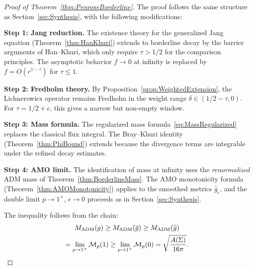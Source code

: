 \begin{proof}[Proof of Theorem~\ref{thm:PenroseBorderline}]
The proof follows the same structure as Section~\ref{sec:Synthesis}, with the following modifications:

\textbf{Step 1: Jang reduction.} The existence theory for the generalized Jang equation (Theorem~\ref{thm:HanKhuri}) extends to borderline decay by the barrier arguments of Han--Khuri, which only require $\tau > 1/2$ for the comparison principles. The asymptotic behavior $f \to 0$ at infinity is replaced by $f = O(r^{1-\tau})$ for $\tau \le 1$.

\textbf{Step 2: Fredholm theory.} By Proposition~\ref{prop:WeightedExtension}, the Lichnerowicz operator remains Fredholm in the weight range $\delta \in (1/2 - \tau, 0)$. For $\tau = 1/2 + \epsilon$, this gives a narrow but non-empty window.

\textbf{Step 3: Mass formula.} The regularized mass formula~\eqref{eq:MassRegularized} replaces the classical flux integral. The Bray--Khuri identity (Theorem~\ref{thm:PhiBound}) extends because the divergence terms are integrable under the refined decay estimates.

\textbf{Step 4: AMO limit.} The identification of mass at infinity uses the \emph{renormalized} ADM mass of Theorem~\ref{thm:BorderlineMass}. The AMO monotonicity formula (Theorem~\ref{thm:AMOMonotonicity}) applies to the smoothed metrics $\hat{g}_\epsilon$, and the double limit $p \to 1^+$, $\epsilon \to 0$ proceeds as in Section~\ref{sec:Synthesis}.

The inequality follows from the chain:
\begin{multline*}
    M_{\mathrm{ADM}}(g) \ge M_{\mathrm{ADM}}(\overline{g}) \ge M_{\mathrm{ADM}}(\widetilde{g}) \\
    = \lim_{p \to 1^+} \mathcal{M}_p(1) \ge \lim_{p \to 1^+} \mathcal{M}_p(0) = \sqrt{\frac{A(\Sigma)}{16\pi}}.
\end{multline*}
\end{proof}


